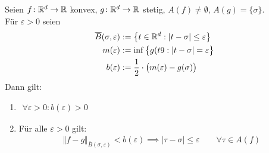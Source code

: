 \begin{lemma}\label{lemma10.1}
	Seien $f\colon\mathbb{R}^d\to\mathbb{R}$ konvex, $g\colon\mathbb{R}^d\to\mathbb{R}$ stetig, $A(f)\neq\emptyset$, $A(g)=\lbrace\sigma\rbrace$.\\
	Für $\varepsilon>0$ seien
	\begin{align*}
		\overline{B}(\sigma,\varepsilon)&:=\big\lbrace t\in\mathbb{R}^d:|t-\sigma|\leq\varepsilon\big\rbrace\\
		m(\varepsilon)&:=\inf\limits\big\lbrace g(t9:|t-\sigma|=\varepsilon\big\rbrace\\
		b(\varepsilon)&:=\frac{1}{2}\cdot\big(m(\varepsilon)-g(\sigma)\big)
	\end{align*}
	Dann gilt:
	\begin{enumerate}[label=(\arabic*)]
		\item $\begin{aligned}
			\forall\varepsilon>0:b(\varepsilon)>0
		\end{aligned}$
		\item Für alle $\varepsilon>0$ gilt:
		\begin{align*}
			\Vert f-g\Vert_{\overline{B}(\sigma,\varepsilon)}<b(\varepsilon)
			\implies|\tau-\sigma|\leq\varepsilon\qquad\forall\tau\in A(f)
		\end{align*}
	\end{enumerate}
\end{lemma}

